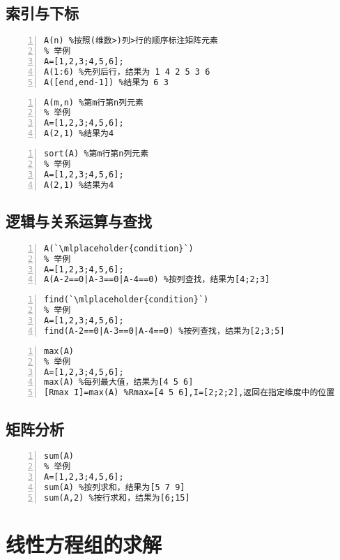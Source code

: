 \subsection{索引与下标}
\begin{lstlisting}[frame=single,numbers=left]
% 索引
A(n) %按照(维数>)列>行的顺序标注矩阵元素
% 举例
A=[1,2,3;4,5,6];
A(1:6) %先列后行，结果为 1 4 2 5 3 6
A([end,end-1]) %结果为 6 3
\end{lstlisting}

\begin{lstlisting}[frame=single,numbers=left]
% 下标
A(m,n) %第m行第n列元素
% 举例
A=[1,2,3;4,5,6];
A(2,1) %结果为4
\end{lstlisting}

\begin{lstlisting}[frame=single,numbers=left]
% 排序
sort(A) %第m行第n列元素
% 举例
A=[1,2,3;4,5,6];
A(2,1) %结果为4
\end{lstlisting}

\subsection{逻辑与关系运算与查找}
\begin{lstlisting}[frame=single,numbers=left]
% 查找元素值
A(`\mlplaceholder{condition}`)
% 举例
A=[1,2,3;4,5,6];
A(A-2==0|A-3==0|A-4==0) %按列查找，结果为[4;2;3]
\end{lstlisting}

\begin{lstlisting}[frame=single,numbers=left]
% 查找元素索引
find(`\mlplaceholder{condition}`)
% 举例
A=[1,2,3;4,5,6];
find(A-2==0|A-3==0|A-4==0) %按列查找，结果为[2;3;5]
\end{lstlisting}

\begin{lstlisting}[frame=single,numbers=left]
% 查找元素最大值
max(A)
% 举例
A=[1,2,3;4,5,6];
max(A) %每列最大值，结果为[4 5 6]
[Rmax I]=max(A) %Rmax=[4 5 6],I=[2;2;2],返回在指定维度中的位置
\end{lstlisting}
\subsection{矩阵分析}
\begin{lstlisting}[frame=single,numbers=left]
% 求和
sum(A)
% 举例
A=[1,2,3;4,5,6];
sum(A) %按列求和，结果为[5 7 9]
sum(A,2) %按行求和，结果为[6;15]
\end{lstlisting}

\section{线性方程组的求解}
